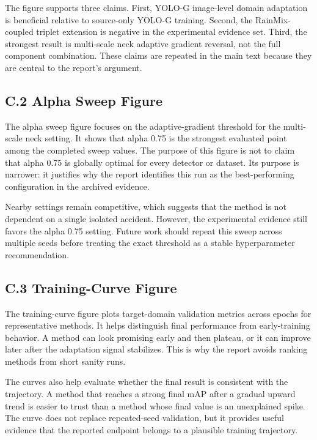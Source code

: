 \documentclass[
  11pt,
]{article}
\begin{document}
The figure supports three claims. First, YOLO-G image-level domain
adaptation is beneficial relative to source-only YOLO-G training.
Second, the RainMix-coupled triplet extension is negative in the
experimental evidence set. Third, the strongest result is multi-scale
neck adaptive gradient reversal, not the full component combination.
These claims are repeated in the main text because they are central to
the report's argument.

\hypertarget{c.2-alpha-sweep-figure}{%
\subsection{C.2 Alpha Sweep Figure}\label{c.2-alpha-sweep-figure}}

The alpha sweep figure focuses on the adaptive-gradient threshold for
the multi-scale neck setting. It shows that alpha 0.75 is the strongest
evaluated point among the completed sweep values. The purpose of this
figure is not to claim that alpha 0.75 is globally optimal for every
detector or dataset. Its purpose is narrower: it justifies why the
report identifies this run as the best-performing configuration in the
archived evidence.

Nearby settings remain competitive, which suggests that the method is
not dependent on a single isolated accident. However, the experimental
evidence still favors the alpha 0.75 setting. Future work should repeat
this sweep across multiple seeds before treating the exact threshold as
a stable hyperparameter recommendation.

\hypertarget{c.3-training-curve-figure}{%
\subsection{C.3 Training-Curve Figure}\label{c.3-training-curve-figure}}

The training-curve figure plots target-domain validation metrics across
epochs for representative methods. It helps distinguish final
performance from early-training behavior. A method can look promising
early and then plateau, or it can improve later after the adaptation
signal stabilizes. This is why the report avoids ranking methods from
short sanity runs.

The curves also help evaluate whether the final result is consistent
with the trajectory. A method that reaches a strong final mAP after a
gradual upward trend is easier to trust than a method whose final value
is an unexplained spike. The curve does not replace repeated-seed
validation, but it provides useful evidence that the reported endpoint
belongs to a plausible training trajectory.
\end{document}
